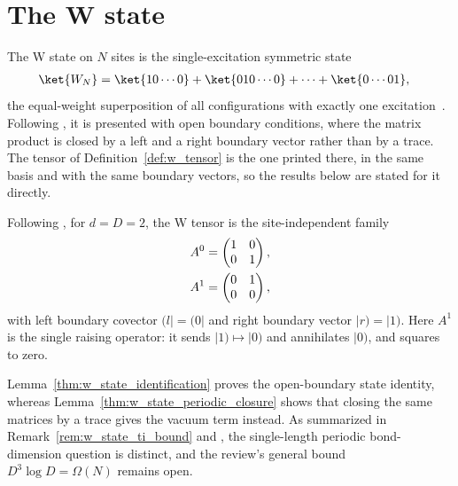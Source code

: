 \section{The W state}\label{sec:w_state}

The W state on $N$ sites is the single-excitation symmetric state
\begin{align}
    \ket{W_N}
     & = \ket{10\cdots0} + \ket{010\cdots0} + \cdots + \ket{0\cdots01},
    \notag
\end{align}
the equal-weight superposition of all configurations with exactly one
excitation~\cite{DurVidalCirac2000}. Following
\cite[Appendix~A, ``The W state'']{Cirac2021Matrix}, it is presented with open
boundary conditions, where the matrix product is closed by a left and a right
boundary vector rather than by a trace. The tensor of
Definition~\ref{def:w_tensor} is the one printed there, in the same basis and
with the same boundary vectors, so the results below are stated for it
directly.

\begin{definition}\label{def:w_tensor}
    \leanok
    Following \cite[Appendix~A, ``The W state'']{Cirac2021Matrix}, for $d=D=2$,
    the W tensor is the site-independent family
    \begin{align}
        A^0 & = \begin{pmatrix}1&0\\0&1\end{pmatrix},
        \notag                                        \\
        A^1 & = \begin{pmatrix}0&1\\0&0\end{pmatrix},
        \notag
    \end{align}
    with left boundary covector $(l|=(0|$ and right boundary vector $|r)=|1)$.
    Here $A^1$ is the single raising operator: it sends $|1)\mapsto|0)$ and
    annihilates $|0)$, and squares to zero.
\end{definition}

Lemma~\ref{thm:w_state_identification} proves the open-boundary state
identity, whereas Lemma~\ref{thm:w_state_periodic_closure} shows that
closing the same matrices by a trace gives the vacuum term instead. As
summarized in Remark~\ref{rem:w_state_ti_bound} and
\cite{gap:rmp_w_state_ti_bound}, the single-length periodic bond-dimension
question is distinct, and the review's general bound $D^3\log D=\Omega(N)$
remains open.

